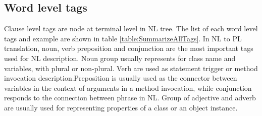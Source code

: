 \subsection{Word level tags}
Clause level tags are node at terminal level in NL tree. The list of each word level tags and example are shown in table \ref{table:SummarizeAllTags}. 
In NL to PL translation, noun, verb preposition and conjunction are the most important tags used for NL description. Noun group usually represents for class name and variables, with plural or non-plural. Verb are used as statement trigger or method invocation description.Preposition is usually used as the connector between variables in the context of arguments in a method invocation, while conjunction responds to the connection between phrase in NL. Group of adjective and adverb are usually used for representing properties of a class or an object instance.

